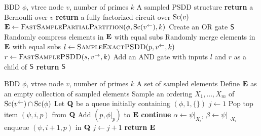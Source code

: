 \setcounter{algorithm}{20}
\begin{algorithm}
  \caption{}\label{alg:fastsamplepsdd}
  \begin{algorithmic}[1]
    \Require BDD $\phi$, vtree node $v$, number of primes $k$
    \Ensure A sampled PSDD structure
      \EndIf
        \State \textbf{return} a Bernoulli over $v$
    \ElsIf{$\phi\equiv\top$}
      \State \textbf{return} a fully factorized circuit over $\operatorname*{\normalfont{Sc}}(v)$
    \EndIf
    \State $\set{E}\gets\Call{FastSamplePartialPartition}{\phi,\Sc(v^{\gets}),k}$
    \State Create an OR gate $\operatorname{\textup{\textsf{S}}}$
    \State Randomly compress elements in $\mathbf{E}$ with equal subs
    \State Randomly merge elements in $\mathbf{E}$ with equal subs
      \State $l\gets\Call{SampleExactPSDD}{p,v^\gets,k}$
      \State $r\gets\Call{FastSamplePSDD}{s,v^\to,k}$
      \State Add an AND gate with inputs $l$ and $r$ as a child of $\operatorname{\textup{\textsf{S}}}$
    \EndFor
    \State \textbf{return} $\operatorname{\textup{\textsf{S}}}$
  \end{algorithmic}
\end{algorithm}

\begin{algorithm}[t]
  \caption{}\label{alg:samplepartial-fast}
  \begin{algorithmic}[1]
    \Require BDD $\phi$, vtree node $v$, number of primes $k$
    \Ensure A set of sampled elements
    \State Define $\mathbf{E}$ as an empty collection of sampled elements
    \State Sample an ordering $X_1,\dotsc,X_m$ of $\operatorname*{\normalfont{Sc}}(v^\gets)\cap\operatorname*{\normalfont{Sc}}(\phi)$
    \State Let $\mathbf{Q}$ be a queue initially containing $(\phi,1,\{\})$
    \State $j\gets 1$ 
      \State Pop top item $(\psi,i,p)$ from $\mathbf{Q}$
        \State Add $\left(p,\phi|_{p}\right)$ to $\mathbf{E}$
        \State \textbf{continue}
      \EndIf
      \State $\alpha\gets\psi|_{X_i}$, $\beta\gets\psi|_{\neg X_i}$
      \If{$\alpha \equiv \beta$} enqueue $(\psi,i+1,p)$ in $\mathbf{Q}$
      \Else
        \State $j\gets j+1$
      \EndIf
    \EndWhile
    \State \textbf{return} $\mathbf{E}$
  \end{algorithmic}
\end{algorithm}

